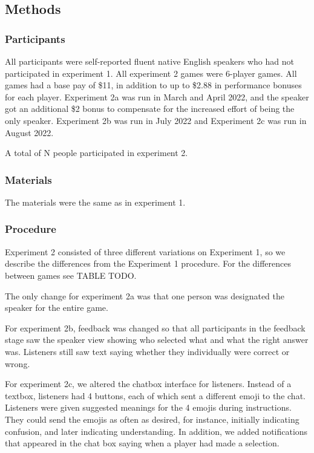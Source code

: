 \documentclass[
  english,
  a4paper,
]{article}
\begin{document}
\hypertarget{methods-1}{%
\subsection{Methods}\label{methods-1}}

\hypertarget{participants-1}{%
\subsubsection{Participants}\label{participants-1}}

All participants were self-reported fluent native English speakers who had not participated in experiment 1.
All experiment 2 games were 6-player games. All games had a base pay of \$11, in addition to up to \$2.88 in performance bonuses for each player.
Experiment 2a was run in March and April 2022, and the speaker got an additional \$2 bonus to compensate for the increased effort of being the only speaker.
Experiment 2b was run in July 2022 and Experiment 2c was run in August 2022.

A total of N people participated in experiment 2.

\hypertarget{materials-1}{%
\subsubsection{Materials}\label{materials-1}}

The materials were the same as in experiment 1.

\hypertarget{procedure-1}{%
\subsubsection{Procedure}\label{procedure-1}}

Experiment 2 consisted of three different variations on Experiment 1, so we describe the differences from the Experiment 1 procedure. For the differences between games see TABLE TODO.

The only change for experiment 2a was that one person was designated the speaker for the entire game.

For experiment 2b, feedback was changed so that all participants in the feedback stage saw the speaker view showing who selected what and what the right answer was. Listeners still saw text saying whether they individually were correct or wrong.

For experiment 2c, we altered the chatbox interface for listeners. Instead of a textbox, listeners had 4 buttons, each of which sent a different emoji to the chat. Listeners were given suggested meanings for the 4 emojis during instructions. They could send the emojis as often as desired, for instance, initially indicating confusion, and later indicating understanding. In addition, we added notifications that appeared in the chat box saying when a player had made a selection.
\end{document}

